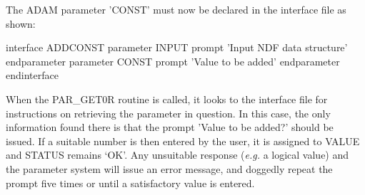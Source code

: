 \documentclass[twoside,11pt,nolof]{starlink}
\begin{document}
The ADAM parameter 'CONST' must now be declared in the interface file as
shown:
\begin{terminalv}
interface ADDCONST
  parameter      INPUT
     prompt      'Input NDF data structure'
  endparameter
  parameter      CONST
     prompt      'Value to be added'
  endparameter
endinterface
\end{terminalv}
When the PAR\_GET0R routine is called, it looks to the interface file
for instructions on retrieving the parameter in question.
In this case, the only information found there is that the
prompt 'Value to be added?' should be issued.
If a suitable number is then entered by the user, it is assigned to VALUE
and STATUS remains `OK'.
Any unsuitable response (\textit{e.g.} a logical value) and the parameter
system will
issue an error message, and doggedly repeat the prompt five times or until
a satisfactory value is entered.
\end{document}
